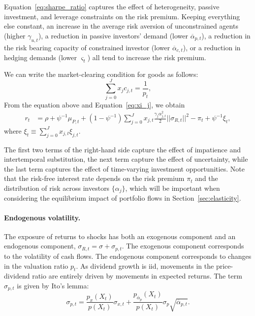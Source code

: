 Equation~\eqref{eq:sharpe_ratio} captures the effect of heterogeneity, passive investment, and leverage constraints on the risk premium. Keeping everything else constant, an increase in the average risk aversion of unconstrained agents (higher $\gamma_{u,t}$), a reduction in passive investors' demand (lower $\overline{\alpha}_{p,t}$), a reduction in the risk bearing capacity of constrained investor (lower $\overline{\alpha}_{c,t}$), or a reduction in hedging demands (lower $\varsigma_t$) all tend to increase the risk premium. 

We can write the market-clearing condition for goods as follows:
\begin{equation}
    \sum_{j=0}^J x_j c_{j,t} = \frac{1}{p_t}, 
\end{equation}
From the equation above and Equation~\eqref{eq:xi_j}, we obtain
\begin{align}\label{eq:interest_rate}
     r_t  &  =  \rho  +\psi^{-1} \mu_{P,t} + \left (1-\psi^{-1}\right )  \sum_{j=0}^J x_{j,t}\frac{\gamma_j \alpha_{j,t}^2}{2} ||\sigma_{R,t}||^2- \pi_t +\psi^{-1} \xi_t,
\end{align}
where $\xi_t \equiv \sum_{j=0}^J x_{j,t} \xi_{j,t}$.

The first two terms of the right-hand side capture the effect of impatience and intertemporal substitution, the next term capture the effect of uncertainty, while the last term captures the effect of time-varying investment opportunities. Note that the risk-free interest rate depends on the risk premium $\pi_t$ and the distribution of risk across investors $\{\alpha_j\}$, which will be important when considering the equilibrium impact of portfolio flows in Section~\ref{sec:elasticity}.

\paragraph{Endogenous volatility.} The exposure of returns to shocks has both an exogenous component and an endogenous component, $\sigma_{R,t} = \sigma + \sigma_{p,t}$. 
The exogenous component corresponds to the volatility of cash flows. 
The endogenous component corresponds to changes in the valuation ratio $p_t$. 
As dividend growth is iid, movements in the price-dividend ratio are entirely driven by movements in expected returns. 
The term $\sigma_{p,t}$ is given by Ito's lemma:
\begin{equation}\label{eq:_endogenous_vol}
    \sigma_{p,t} = \frac{p_x(X_t)}{p(X_t)} \sigma_{x,t} + \frac{p_{\overline{\alpha}_p}(X_t)}{p(X_t)} \sigma_{p} \sqrt{\overline{\alpha}_{p,t}}. 
\end{equation}


